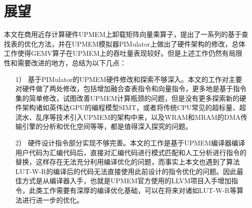 \section{展望}
本文在商用近存计算硬件UPMEM上卸载矩阵向量乘算子，提出了一系列的基于查找表的优化方法，并在UPMEM模拟器PIMulator上做出了硬件架构的修改，总体工作使得GEMV算子在UPMEM上的吞吐量表现较好。但是上述工作仍然有局限性和需要改进的地方，总结为以下几点：
\begin{itemize}
	\item [1）]
	基于PIMulator的UPMEM硬件修改和探索不够深入。本文的工作对主要对硬件做了两处修改，包括增加融合查表指令和向量指令，更多地是基于指令集的简单修改，试图改善UPMEM计算瓶颈的问题，但是没有更多探索新的硬件架构诸如英伟达GPU的编程模型SIMT，或者将传统CPU常见的超标量、超流水、乱序等技术引入UPMEM的架构中来，以及WRAM和MRAM的DMA传输引擎的分析和优化空间等等，都是值得深入探究的问题。
	\item [2）]
	硬件设计指令部分实现不够完善。本文的工作是基于UPMEM编译器编译用户代码为汇编代码后，直接对汇编代码进行模式匹配和人工分析进行指令的替换，这样存在无法充分利用编译优化的问题，而事实上本文也遇到了算法LUT-W-R的编译后的代码无法直接使用此前设计的指令优化的问题。因此最佳方式是从编译器入手，也就是UPMEM官方使用的LLVM项目入手增加指令，此类工作需要有深厚的编译优化基础，可以在将来对诸如LUT-W-R等算法进行进一步的优化。
\end{itemize}